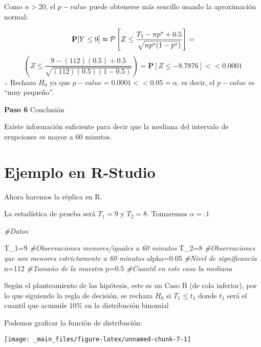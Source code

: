 \documentclass[
  a4paper,
  oneside,
  openany]{book}
\newenvironment{Shaded}{\begin{snugshade}}{\end{snugshade}}
\newcommand{\CommentTok}[1]{\textcolor[rgb]{0.56,0.35,0.01}{\textit{#1}}}
\newcommand{\DecValTok}[1]{\textcolor[rgb]{0.00,0.00,0.81}{#1}}
\newcommand{\FloatTok}[1]{\textcolor[rgb]{0.00,0.00,0.81}{#1}}
\newcommand{\NormalTok}[1]{#1}
\begin{document}
Como \(n > 20\), el \(p-value\) puede obtenerse más sencillo usando la aproximación normal:

\[\mathbf{P}[Y\leq 9] \thickapprox \mathcal{P} \left[Z\leq\frac{T_{1}-np^*+0.5}{\sqrt{np^*(1-p^*)}}\right]=\]
\[\left(Z\leq\frac{9-(112)(0.5)+0.5}{\sqrt{(112)(0.5)(1-0.5)}}\right)=\mathbf{P}[Z\leq -8.7876] < < 0.0001\]
\(\therefore\) Rechazo \(H_0\) ya que \(p-value=0.0001<<0.05=\alpha.\) es decir, el \(p-value\) es ``muy pequeño''.

\textbf{Paso 6} Conclusión

Existe información suficiente para decir que la mediana del intervalo de erupciones es mayor a 60 minutos.

\hypertarget{ejemplo-en-r-studio-1}{%
\section{Ejemplo en R-Studio}\label{ejemplo-en-r-studio-1}}

Ahora haremos la réplica en R.

La estadística de prueba será \(T_1=9\) y \(T_2=8\). Tomaremos \(\alpha=.1\)

\begin{Shaded}
\begin{Highlighting}[]
\CommentTok{\#Datos}

\NormalTok{T\_}\DecValTok{1}\NormalTok{=}\DecValTok{9}         \CommentTok{\#Observaciones menores/iguales a 60 minutos}
\NormalTok{T\_}\DecValTok{2}\NormalTok{=}\DecValTok{8}         \CommentTok{\#Observaciones que son menores estrictamente a 60 minutos}
\NormalTok{alpha=}\FloatTok{0.05}    \CommentTok{\#Nivel de significancia}
\NormalTok{n=}\DecValTok{112}         \CommentTok{\#Tamaño de la muestra}
\NormalTok{p=}\FloatTok{0.5}         \CommentTok{\#Cuantil en este caso la mediana }
\end{Highlighting}
\end{Shaded}

Según el planteamiento de las hipótesis, este es un Caso B (de cola inferior), por lo que siguiendo la regla de decisión, se rechaza \(H_0\) si \(T_1\leq t_1\) donde \(t_1\) será el cuantil que acumule 10\% en la distribución binomial

Podemos graficar la función de distribución:

\begin{center}\texttt{[image: \_main\_files/figure-latex/unnamed-chunk-7-1]} \end{center}
\end{document}

